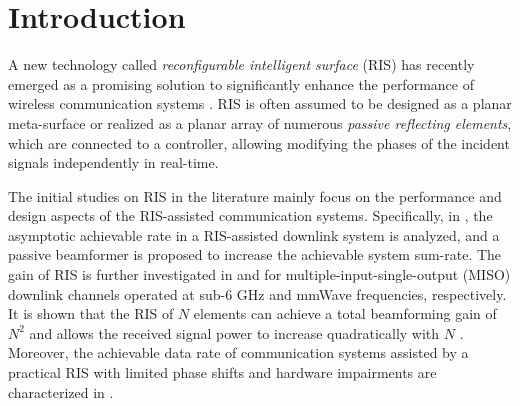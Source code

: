\documentclass[conference]{IEEEtran}
\begin{document}
	
	\section{Introduction}
	
	
	A new technology called \emph{reconfigurable intelligent surface} (RIS) has recently emerged as a promising solution to significantly enhance the performance of wireless communication systems \cite{di_renzo_smart_2019}. RIS is often assumed to be designed as a planar meta-surface or realized as a planar array of numerous \emph{passive reflecting elements}, which are connected to a controller, allowing modifying the phases of the incident signals independently in real-time. 
	
	The initial studies on RIS in the literature mainly focus on the performance and design aspects of the RIS-assisted communication systems. Specifically, in \cite{jung2020asymptotic}, the asymptotic achievable rate in a RIS-assisted downlink system is analyzed, and a passive beamformer is proposed to increase the achievable system sum-rate. The gain of RIS is further investigated in \cite{wu2019intelligent} and \cite{wang2020intelligent} for multiple-input-single-output (MISO) downlink channels operated at sub-6 GHz and mmWave frequencies, respectively. It is shown that the RIS of $N$ elements can achieve a total beamforming gain of $N^2$ \cite{wu2019intelligent} and allows the received signal power to increase quadratically with $N$ \cite{wang2020intelligent}. Moreover, the achievable data rate of communication systems assisted by a practical RIS with limited phase shifts and hardware impairments are characterized in \cite{zhang2020reconfigurable, guo2019weighted}.
	
\end{document}
